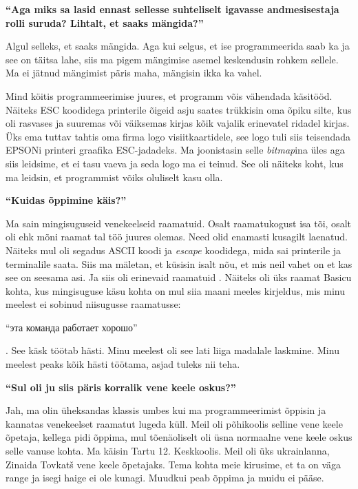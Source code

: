 \textbf{\enquote{Aga miks sa lasid ennast sellesse suhteliselt igavasse andmesisestaja rolli suruda? Lihtalt, et saaks mängida?}}

Algul selleks, et saaks mängida. Aga kui selgus, et ise programmeerida saab ka ja see on täitsa lahe, siis ma pigem mängimise asemel keskendusin rohkem sellele. Ma ei jätnud mängimist päris maha, mängisin ikka ka vahel. 

Mind köitis programmeerimise juures, et programm võis vähendada käsitööd. Näiteks ESC koodidega printerile õigeid asju saates trükkisin oma õpiku silte, kus oli rasvases ja suuremas või väiksemas kirjas kõik vajalik erinevatel ridadel  kirjas. Üks ema tuttav tahtis oma firma logo visiitkaartidele, see logo tuli siis teisendada EPSONi printeri graafika ESC-jadadeks. Ma joonistasin selle \emph{bitmap}ina üles aga siis leidsime, et ei tasu vaeva ja seda logo ma ei teinud. See oli näiteks koht, kus ma leidsin, et programmist võiks oluliselt kasu olla. 

\textbf{\enquote{Kuidas õppimine käis?}}

Ma sain mingisuguseid venekeelseid raamatuid. Osalt raamatukogust isa tõi, osalt oli ehk mõni raamat tal töö juures olemas.  Need olid enamasti kusagilt laenatud. Näiteks mul oli segadus ASCII koodi ja \emph{escape} koodidega, mida sai printerile ja terminalile saata. Siis ma mäletan, et küsisin isalt nõu, et mis neil vahet on et kas see on seesama asi. Ja siis oli erinevaid raamatuid . Näiteks oli üks raamat Basicu kohta, kus mingisuguse käsu kohta on mul siia maani meeles kirjeldus, mis minu meelest ei sobinud niisugusse raamatusse: \begin{russian}\enquote{эта команда работает хорошо}\end{russian}. See käsk töötab hästi. Minu meelest oli see lati liiga madalale laskmine. Minu meelest peaks kõik hästi töötama, asjad tuleks nii teha. 

\textbf{\enquote{Sul oli ju siis päris korralik vene keele oskus?}}

Jah, ma olin üheksandas klassis umbes kui ma programmeerimist õppisin ja kannatas venekeelset raamatut lugeda küll. Meil oli põhikoolis selline vene keele õpetaja, kellega pidi õppima, mul tõenäoliselt oli üsna normaalne vene keele oskus selle vanuse kohta. Ma käisin Tartu 12. Keskkoolis. Meil oli üks ukrainlanna, Zinaida Tovkatš vene keele õpetajaks. Tema kohta meie kirusime, et ta on väga range ja isegi haige ei ole kunagi. Muudkui peab õppima ja muidu ei pääse. 

